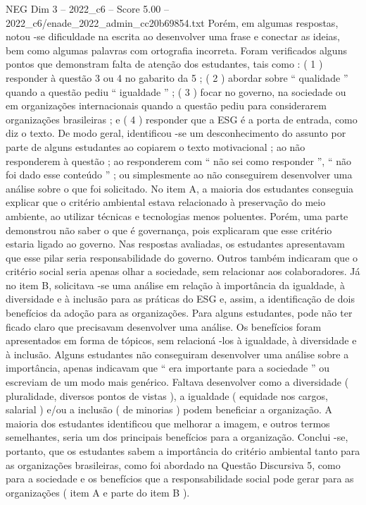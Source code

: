 \begin{textsample}{NEG Dim 3 – 2022\_c6 – Score 5.00 – 2022\_c6/enade\_2022\_admin\_cc20b69854.txt}
Porém, em algumas respostas, notou -se dificuldade na escrita ao desenvolver uma frase e conectar as ideias, bem como algumas palavras com ortografia incorreta.
Foram verificados alguns pontos que demonstram falta de atenção dos estudantes, tais como : ( 1 ) responder à questão 3 ou 4 no gabarito da 5 ; ( 2 ) abordar sobre “ qualidade ” quando a questão pediu “ igualdade ” ; ( 3 ) focar no governo, na sociedade ou em organizações internacionais quando a questão pediu para considerarem organizações brasileiras ; e ( 4 ) responder que a ESG é a porta de entrada, como diz o texto.
De modo geral, identificou -se um desconhecimento do assunto por parte de alguns estudantes ao copiarem o texto motivacional ; ao não responderem à questão ; ao responderem com “ não sei como responder ”, “ não foi dado esse conteúdo ” ; ou simplesmente ao não conseguirem desenvolver uma análise sobre o que foi solicitado.
No item A, a maioria dos estudantes conseguia explicar que o critério ambiental estava relacionado à preservação do meio ambiente, ao utilizar técnicas e tecnologias menos poluentes.
Porém, uma parte demonstrou não saber o que é governança, pois explicaram que esse critério estaria ligado ao governo.
Nas respostas avaliadas, os estudantes apresentavam que esse pilar seria responsabilidade do governo.
Outros também indicaram que o critério social seria apenas olhar a sociedade, sem relacionar aos colaboradores.
Já no item B, solicitava -se uma análise em relação à importância da igualdade, à diversidade e à inclusão para as práticas do ESG e, assim, a identificação de dois benefícios da adoção para as organizações.
Para alguns estudantes, pode não ter ficado claro que precisavam desenvolver uma análise.
Os benefícios foram apresentados em forma de tópicos, sem relacioná -los à igualdade, à diversidade e à inclusão.
Alguns estudantes não conseguiram desenvolver uma análise sobre a importância, apenas indicavam que “ era importante para a sociedade ” ou escreviam de um modo mais genérico.
Faltava desenvolver como a diversidade ( pluralidade, diversos pontos de vistas ), a igualdade ( equidade nos cargos, salarial ) e/ou a inclusão ( de minorias ) podem beneficiar a organização.
A maioria dos estudantes identificou que melhorar a imagem, e outros termos semelhantes, seria um dos principais benefícios para a organização.
Conclui -se, portanto, que os estudantes sabem a importância do critério ambiental tanto para as organizações brasileiras, como foi abordado na Questão Discursiva 5, como para a sociedade e os benefícios que a responsabilidade social pode gerar para as organizações ( item A e parte do item B ).

\end{textsample}

